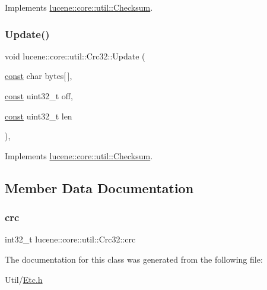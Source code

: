Implements \mbox{\hyperlink{classlucene_1_1core_1_1util_1_1Checksum_a7c6a70391ed64a38eb6f3db43876f652}{lucene\+::core\+::util\+::\+Checksum}}.

\mbox{\label{classlucene_1_1core_1_1util_1_1Crc32_aadb0ec93d3d2097302c869a1f4f61602}} 
\subsubsection{\texorpdfstring{Update()}{Update()}\hspace{0.1cm}{\footnotesize\ttfamily [2/2]}}
{\footnotesize\ttfamily void lucene\+::core\+::util\+::\+Crc32\+::\+Update (\begin{DoxyParamCaption}\item[{\mbox{\hyperlink{ZlibCrc32_8h_a2c212835823e3c54a8ab6d95c652660e}{const}} char}]{bytes\mbox{[}$\,$\mbox{]},  }\item[{\mbox{\hyperlink{ZlibCrc32_8h_a2c212835823e3c54a8ab6d95c652660e}{const}} uint32\+\_\+t}]{off,  }\item[{\mbox{\hyperlink{ZlibCrc32_8h_a2c212835823e3c54a8ab6d95c652660e}{const}} uint32\+\_\+t}]{len }\end{DoxyParamCaption})\hspace{0.3cm}{\ttfamily [inline]}, {\ttfamily [virtual]}}



Implements \mbox{\hyperlink{classlucene_1_1core_1_1util_1_1Checksum_aab3bdd13efe91e6e582b56fd64a304b6}{lucene\+::core\+::util\+::\+Checksum}}.



\subsection{Member Data Documentation}
\mbox{\label{classlucene_1_1core_1_1util_1_1Crc32_a6bb849cd1220fc45e59a277fec437e8a}} 
\subsubsection{\texorpdfstring{crc}{crc}}
{\footnotesize\ttfamily int32\+\_\+t lucene\+::core\+::util\+::\+Crc32\+::crc\hspace{0.3cm}{\ttfamily [private]}}



The documentation for this class was generated from the following file\+:\begin{DoxyCompactItemize}
\item 
Util/\mbox{\hyperlink{Etc_8h}{Etc.\+h}}\end{DoxyCompactItemize}

